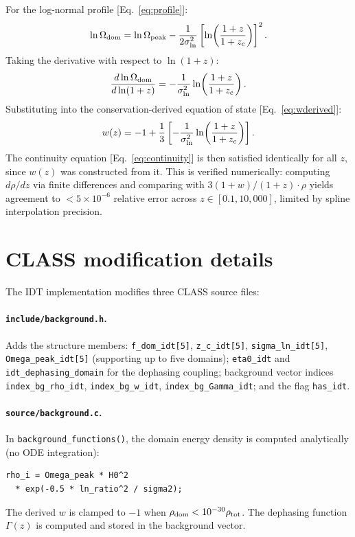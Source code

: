 \documentclass[aps,prd,twocolumn,superscriptaddress,nofootinbib]{revtex4-2}
\newcommand{\Odom}{\Omega_{\rm dom}}
\newcommand{\zc}{z_{\rm c}}
\newcommand{\sln}{\sigma_{\ln}}
\begin{document}
For the log-normal profile [Eq.~\eqref{eq:profile}]:
\begin{equation}
\ln\Odom = \ln\Omega_{\rm peak} - \frac{1}{2\sln^2}
\left[\ln\!\left(\frac{1+z}{1+\zc}\right)\right]^2.
\end{equation}
Taking the derivative with respect to $\ln(1+z)$:
\begin{equation}
\frac{d\ln\Odom}{d\ln(1+z)} = -\frac{1}{\sln^2}
\ln\!\left(\frac{1+z}{1+\zc}\right).
\end{equation}
Substituting into the conservation-derived equation of state
[Eq.~\eqref{eq:wderived}]:
\begin{equation}
w(z) = -1 + \frac{1}{3}\left[-\frac{1}{\sln^2}
\ln\!\left(\frac{1+z}{1+\zc}\right)\right].
\end{equation}
The continuity equation [Eq.~\eqref{eq:continuity}] is then
satisfied identically for all $z$, since $w(z)$ was constructed
from it. This is verified numerically: computing $d\rho/dz$ via
finite differences and comparing with $3(1+w)/(1+z)\cdot\rho$
yields agreement to $< 5 \times 10^{-6}$ relative error across
$z \in [0.1, 10{,}000]$, limited by spline interpolation precision.


\section{CLASS modification details}
\label{app:class}

The IDT implementation modifies three CLASS source files:

\paragraph{\texttt{include/background.h}.}
Adds the structure members: \texttt{f\_dom\_idt[5]},
\texttt{z\_c\_idt[5]}, \texttt{sigma\_ln\_idt[5]},
\texttt{Omega\_peak\_idt[5]} (supporting up to five domains);
\texttt{eta0\_idt} and \texttt{idt\_dephasing\_domain} for the
dephasing coupling; background vector indices
\texttt{index\_bg\_rho\_idt}, \texttt{index\_bg\_w\_idt},
\texttt{index\_bg\_Gamma\_idt}; and the flag \texttt{has\_idt}.

\paragraph{\texttt{source/background.c}.}
In \texttt{background\_functions()}, the domain energy density is
computed analytically (no ODE integration):
\begin{verbatim}
rho_i = Omega_peak * H0^2
  * exp(-0.5 * ln_ratio^2 / sigma2);
\end{verbatim}
The derived $w$ is clamped to $-1$ when $\rho_{\rm dom} <
10^{-30}\rho_{\rm tot}$. The dephasing function $\Gamma(z)$
is computed and stored in the background vector.
\end{document}
